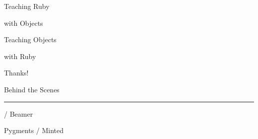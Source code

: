 \documentclass[20pt]{beamer}
\begin{document}
\begin{frame}
	\par { Teaching Ruby}\par
	\vspace{3cm}\hfill
	{with Objects}
\end{frame}

\begin{frame}
	\par { Teaching Objects}\par
	\vspace{3cm}\hfill
	{with Ruby}
\end{frame}

\begin{frame}
	\begin{center}
		\vspace{2.5cm}
		{Thanks!}
		\vspace{1.5cm}

		Behind the Scenes
		\par\rule[3mm]{3cm}{0.1mm}

		\XeLaTeX / Beamer

		Pygments / Minted
	\end{center}
\end{frame}
\end{document}
